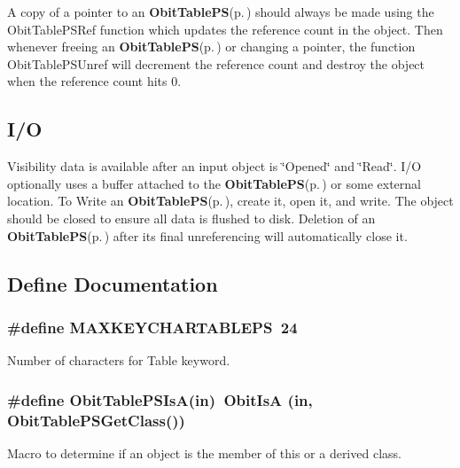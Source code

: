A copy of a pointer to an {\bf Obit\-Table\-PS}{\rm (p.\,\pageref{structObitTablePS})} should always be made using the Obit\-Table\-PSRef function which updates the reference count in the object. Then whenever freeing an {\bf Obit\-Table\-PS}{\rm (p.\,\pageref{structObitTablePS})} or changing a pointer, the function Obit\-Table\-PSUnref will decrement the reference count and destroy the object when the reference count hits 0.\subsection{I/O}\label{ObitTablePS_8h_ObitTablePSUsage}
Visibility data is available after an input object is \char`\"{}Opened\char`\"{} and \char`\"{}Read\char`\"{}. I/O optionally uses a buffer attached to the {\bf Obit\-Table\-PS}{\rm (p.\,\pageref{structObitTablePS})} or some external location. To Write an {\bf Obit\-Table\-PS}{\rm (p.\,\pageref{structObitTablePS})}, create it, open it, and write. The object should be closed to ensure all data is flushed to disk. Deletion of an {\bf Obit\-Table\-PS}{\rm (p.\,\pageref{structObitTablePS})} after its final unreferencing will automatically close it.

\subsection{Define Documentation}
\subsubsection{\setlength{\rightskip}{0pt plus 5cm}\#define MAXKEYCHARTABLEPS\ 24}\label{ObitTablePS_8h_a0}


Number of characters for Table keyword. 

\subsubsection{\setlength{\rightskip}{0pt plus 5cm}\#define Obit\-Table\-PSIs\-A(in)\ Obit\-Is\-A (in, Obit\-Table\-PSGet\-Class())}\label{ObitTablePS_8h_a3}


Macro to determine if an object is the member of this or a derived class. 

